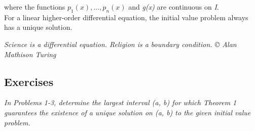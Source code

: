 \documentclass{article}
\begin{document}
where the functions \begin{math} p_1(x),...,p_n(x) \end{math} and  \textsl{g(x)} are continuous on \textsl{I}.\\
\indent\setlength{\parindent}{1em}For a linear higher-order differential equation, the initial value problem always has a unique solution.

\begin{displayquote}
     \textsl{Science is a differential equation. Religion is a boundary condition. ©  Alan Mathison Turing}
\end{displayquote}

\subsection{Exercises}
\textsl{In Problems 1-3, determine the largest interval (a, b) for which Theorem 1 guarantees the existence of a unique solution on (a, b) to the given initial value problem.}
\end{document}

